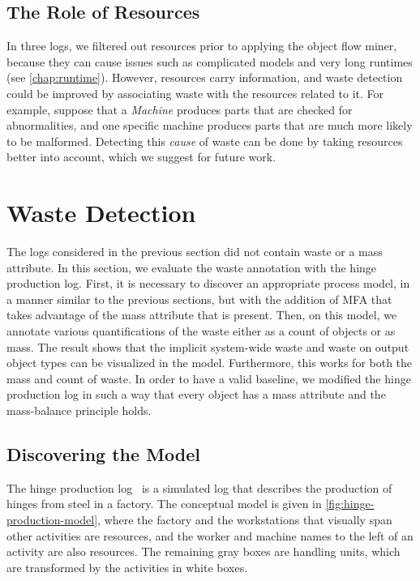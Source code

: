 \subsection{The Role of Resources}



In three logs, we filtered out resources prior to applying the object flow miner, because they can cause issues such as complicated models and very long runtimes (see \cref{chap:runtime}).
However, resources carry information, and waste detection could be improved by associating waste with the resources related to it.
For example, suppose that a \emph{Machine} produces parts that are checked for abnormalities, and one specific machine produces parts that are much more likely to be malformed.
Detecting this \emph{cause} of waste can be done by taking resources better into account, which we suggest for future work.





\section{Waste Detection}
\label{chap:evaluate-waste-detection}


The logs considered in the previous section did not contain waste or a mass attribute.
In this section, we evaluate the waste annotation with the hinge production log.
First, it is necessary to discover an appropriate process model, in a manner similar to the previous sections, but with the addition of MFA that takes advantage of the mass attribute that is present.
Then, on this model, we annotate various quantifications of the waste either as a count of objects or as mass.
The result shows that the implicit system-wide waste and waste on output object types can be visualized in the model.
Furthermore, this works for both the mass and count of waste.
In order to have a valid baseline, we modified the hinge production log in such a way that every object has a mass attribute and the mass-balance principle holds.



\subsection{Discovering the Model}
\label{chap:eval-hinge-production}



The hinge production log~\autocite{hingeproduction} is a simulated log that describes the production of hinges from steel in a factory.
The conceptual model is given in \autoref{fig:hinge-production-model}, where the factory and the workstations that visually span other activities are resources, and the worker and machine names to the left of an activity are also resources.
The remaining gray boxes are handling units, which are transformed by the activities in white boxes.



